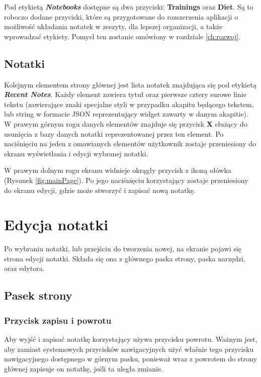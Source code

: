 Pod etykietą \textbf{\textit{Notebooks}} dostępne są dwa przyciski: \textbf{Trainings} oraz \textbf{Diet}. Są to roboczo dodane przyciski, które są przygotowane do rozszerzenia aplikacji o możliwość układania notatek w zeszyty, dla lepszej organizacji, a także wprowadzać etykiety.
Pomysł ten zostanie omówiony w rozdziale \ref{ch:rozwoj}.

\subsection{Notatki}

Kolejnym elementem strony głównej jest lista notatek znajdująca się pod etykietą \textbf{\textit{Recent Notes}}. Każdy element zawiera tytuł oraz pierwsze cztery surowe linie tekstu (zawierające znaki specjalne styli w przypadku akapitu będącego tekstem, lub string w formacie JSON reprezentujący widget zawarty w danym akapitie).
W prawym górnym rogu danych elementów znajduje się przycisk \textbf{X} służący do usunięcia z bazy danych notatki reprezentowanej przez ten element.
Po naciśnięciu na jeden z omawianych elementów użytkownik zostaje przeniesiony do ekranu wyświetlania i edycji wybranej notatki.

W prawym dolnym rogu ekranu widnieje okrągły przycisk z ikoną ołówka (Rysunek \ref{fig:mainPage}).
Po jego naciśnięciu korzystający zostaje przeniesiony do ekranu edycji, gdzie może stworzyć i zapisać nową notatkę.

\section{Edycja notatki}

Po wybraniu notatki, lub przejściu do tworzenia nowej, na ekranie pojawi się strona edycji notatki. Składa się ona z głównego paska strony, paska narzędzi, oraz edytora.

\subsection{Pasek strony}

\subsubsection{Przycisk zapisu i powrotu}

Aby wyjść i zapisać notatkę korzystający używa przycisku powrotu.
Ważnym jest, aby zamiast systemowych przycisków nawigacyjnych użyć właśnie tego przycisku nawigacyjnego dostępnego w górnym pasku, ponieważ wraz z powrotem do strony głównej zapisuje on notatkę, jeśli ta uległa zmianie.

